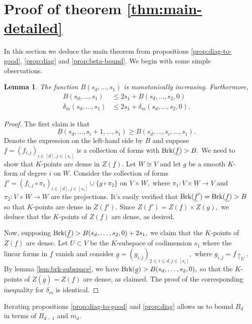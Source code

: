 \documentclass[12pt]{amsart}
\let\ul\underline
\newtheorem{lemma}[theorem]{Lemma}
\theoremstyle{definition}
\newcommand{\brk}{\textnormal{Brk}}
\let\ul\underline
\begin{document}
\section{Proof of theorem \ref{thm:main-detailed}}

In this section we deduce the main theorem from  propositions \ref{prop:diag-to-good}, \ref{prop:diag} and \ref{prop:beta-bound}. We begin with some simple observations.

\begin{lemma}\label{lem:monotone+linears}
    The function $B(s_d,\ldots,s_1)$ is monotonically increasing. Furthermore, 
    \begin{align*}
        B(s_d,\ldots,s_1) &\le 2s_1+B(s_d,\ldots,s_2,0) \\
        \delta_m(s_d,\ldots,s_1) &\le 2s_1+\delta_m(s_d,\ldots,s_2,0).
    \end{align*}
\end{lemma}

\begin{proof}
    The first claim is that 
    \[
    B(s_d,\ldots,s_i+1,\ldots,s_1) \ge B(s_d,\ldots,s_i,\ldots,s_1).
    \]
    Denote the expression on the left-hand side by $B$ and suppose $\ul{f} = (f_{i,j})_{i\in [d],j\in [s_i]}$ is a collection of forms with $\brk(\ul{f}) > B.$ We need to show that $K$-points are dense in $Z(\ul{f}).$ Let $W\cong V$ and let $g$ be a smooth $K$-form of degree $i$ on $W.$ Consider the collection of forms $\ul{f}' = (f_{i,j}\circ \pi_1)_{i\in [d],j\in [s_i]} \cup\{g\circ \pi_2\}$ on $V\times W,$ where $\pi_1:V\times W\to V $ and $\pi_2:V\times W\to W$ are the projections. It's easily verified that $\brk(\ul{f}') = \brk(\ul{f}) > B$ so that $K$-points are dense in $Z(\ul{f}').$ Since $Z(\ul{f}') = Z(\ul{f})\times Z(g),$ we deduce that the $K$-points of $Z(\ul{f})$ are dense, as desired. 

     Now, supposing $\brk(\ul{f}) > B(s_d,\ldots,s_2,0)+2s_1,$ we claim that the $K$-points of $Z(\ul{f})$ are dense. Let $U\subset V$ be the $K$-subspace of codimension $s_1$ where the linear forms in $\ul{f}$ vanish and consider $\ul{g} = (g_{i,j})_{2\le i\le d, j\in [s_i]},$ where $g_{i,j} = f\restriction_U.$ By lemma \ref{lem:brk-subspace}, we have $\brk(\ul{g}) > B(s_d,\ldots,s_2,0),$ so that the $K$-points of $Z(\ul{g}) = Z(\ul{f})$ are dense, as claimed. The proof of the corresponding inequality for $\delta_m$ is identical.
\end{proof}
 
Iterating propositions \ref{prop:diag-to-good} and \ref{prop:diag} allows us to bound $B_d$ in terms of $B_{d-1}$ and $m_d.$
\end{document}
